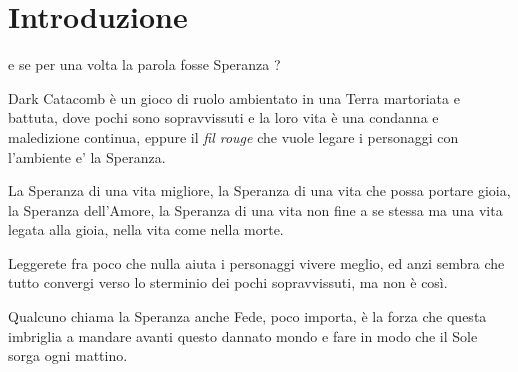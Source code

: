\documentclass[a4paper,twoside,openany]{book}
\begin{document}








\section{Introduzione}

e se per una volta la parola fosse Speranza ?

Dark Catacomb è un gioco di ruolo ambientato in una Terra martoriata e battuta, dove pochi sono sopravvissuti e la loro vita è una condanna e maledizione continua, eppure il \emph{fil rouge} che vuole legare i personaggi con l'ambiente e' la Speranza.

La Speranza di una vita migliore, la Speranza di una vita che possa portare gioia, la Speranza dell'Amore, la Speranza di una vita non fine a se stessa ma una vita legata alla gioia, nella vita come nella morte.

Leggerete fra poco che nulla aiuta i personaggi vivere meglio, ed anzi sembra che tutto convergi verso lo sterminio dei pochi sopravvissuti, ma non è così.

Qualcuno chiama la Speranza anche Fede, poco importa, è la forza che questa imbriglia a mandare avanti questo dannato mondo e fare in modo che il Sole sorga ogni mattino.
\end{document}
